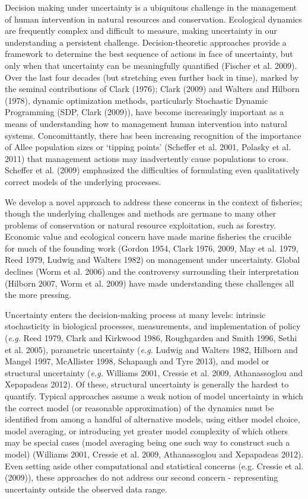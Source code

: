 \documentclass[]{components/elsarticle}
\begin{document}
Decision making under uncertainty is a ubiquitous challenge in the
management of human intervention in natural resources and conservation.
Ecological dynamics are frequently complex and difficult to measure,
making uncertainty in our understanding a persistent challenge.
Decision-theoretic approaches provide a framework to determine the best
sequence of actions in face of uncertainty, but only when that
uncertainty can be meaningfully quantified (Fischer et al. 2009). Over
the last four decades (but stretching even further back in time), marked
by the seminal contributions of Clark (1976); Clark (2009) and Walters
and Hilborn (1978), dynamic optimization methods, particularly
Stochastic Dynamic Programming (SDP, Clark (2009)), have become
increasingly important as a means of understanding how to management
human intervention into natural systems. Concomittantly, there has been
increasing recognition of the importance of Allee population sizes or
`tipping points' (Scheffer et al. 2001, Polasky et al. 2011) that
management actions may inadvertently cause populations to cross.
Scheffer et al. (2009) emphasized the difficulties of formulating even
qualitatively correct models of the underlying processes.

We develop a novel approach to address these concerns in the context of
fisheries; though the underlying challenges and methods are germane to
many other problems of conservation or natural resource exploitation,
such as forestry. Economic value and ecological concern have made marine
fisheries the crucible for much of the founding work (Gordon 1954, Clark
1976, 2009, May et al. 1979, Reed 1979, Ludwig and Walters 1982) on
management under uncertainty. Global declines (Worm et al. 2006) and the
controversy surrounding their interpretation (Hilborn 2007, Worm et al.
2009) have made understanding these challenges all the more pressing.

Uncertainty enters the decision-making process at many levels: intrinsic
stochasticity in biological processes, measurements, and implementation
of policy (\emph{e.g.} Reed 1979, Clark and Kirkwood 1986, Roughgarden
and Smith 1996, Sethi et al. 2005), parametric uncertainty (\emph{e.g.}
Ludwig and Walters 1982, Hilborn and Mangel 1997, McAllister 1998,
Schapaugh and Tyre 2013), and model or structural uncertainty
(\emph{e.g.} Williams 2001, Cressie et al. 2009, Athanassoglou and
Xepapadeas 2012). Of these, structural uncertainty is generally the
hardest to quantify. Typical approaches assume a weak notion of model
uncertainty in which the correct model (or reasonable approximation) of
the dynamics must be identified from among a handful of alternative
models, using either model choice, model averaging, or introducing yet
greater model complexity of which others may be special cases (model
averaging being one such way to construct such a model) (Williams 2001,
Cressie et al. 2009, Athanassoglou and Xepapadeas 2012). Even setting
aside other computational and statistical concerns (e.g. Cressie et al.
(2009)), these approaches do not address our second concern -
representing uncertainty outside the observed data range.
\end{document}
